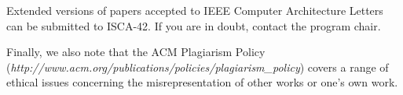 \documentclass[pageno]{jpaper}
\begin{document}
Extended versions of papers accepted to IEEE Computer Architecture
Letters can be submitted to ISCA-42.  If you are in doubt, contact the
program chair.

Finally, we also note that the ACM Plagiarism Policy ({\em http://www.acm.org/publications/policies/plagiarism\_policy}) covers a range of ethical issues concerning the misrepresentation of other works or one's own work.



\end{document}
